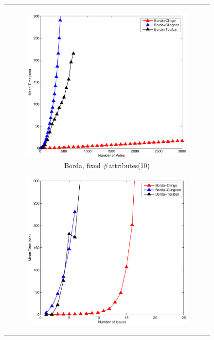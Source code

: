 \begin{figure}[ht!]
	\centering
	\setlength{\tabcolsep}{0mm}
	\begin{tabular}{c}
  \begin{subfigure}[b]{0.44\textwidth}
		\includegraphics[width=\textwidth]{figs/bordaFIMSCICP.pdf}
		\captionsetup{font=scriptsize}
		\caption{Borda, fixed \#attributes(10)}
		\label{fig:comparison:win:1}
	\end{subfigure}
  \begin{subfigure}[b]{0.44\textwidth}
		\includegraphics[width=\textwidth]{figs/bordaFVMSCICP.pdf}

\end{subfigure}
\end{tabular}
\end{figure}
